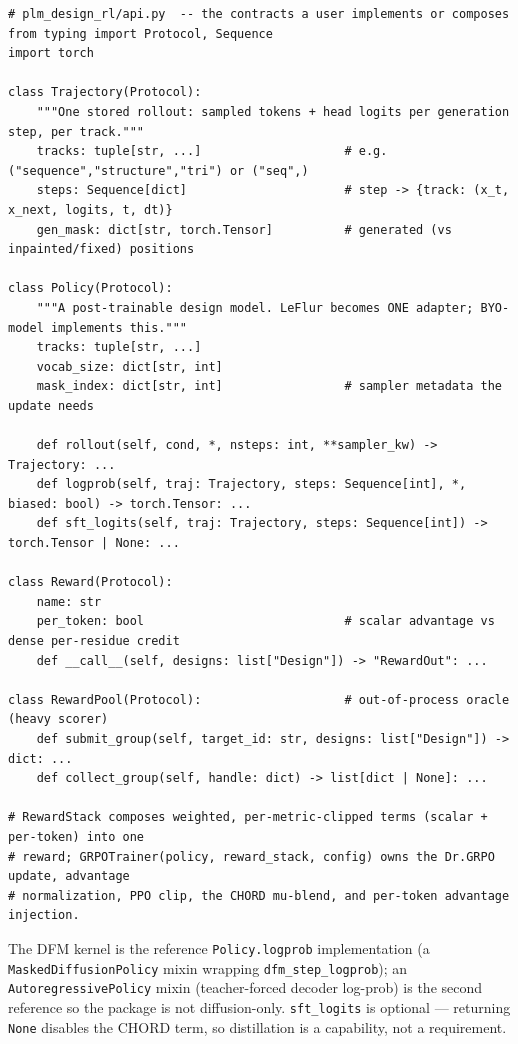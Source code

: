 \documentclass[11pt]{article}
\newcommand{\ttk}[1]{\texttt{\small #1}}
\begin{document}
\begin{verbatim}
# plm_design_rl/api.py  -- the contracts a user implements or composes
from typing import Protocol, Sequence
import torch

class Trajectory(Protocol):
    """One stored rollout: sampled tokens + head logits per generation step, per track."""
    tracks: tuple[str, ...]                    # e.g. ("sequence","structure","tri") or ("seq",)
    steps: Sequence[dict]                      # step -> {track: (x_t, x_next, logits, t, dt)}
    gen_mask: dict[str, torch.Tensor]          # generated (vs inpainted/fixed) positions

class Policy(Protocol):
    """A post-trainable design model. LeFlur becomes ONE adapter; BYO-model implements this."""
    tracks: tuple[str, ...]
    vocab_size: dict[str, int]
    mask_index: dict[str, int]                 # sampler metadata the update needs

    def rollout(self, cond, *, nsteps: int, **sampler_kw) -> Trajectory: ...
    def logprob(self, traj: Trajectory, steps: Sequence[int], *, biased: bool) -> torch.Tensor: ...
    def sft_logits(self, traj: Trajectory, steps: Sequence[int]) -> torch.Tensor | None: ...

class Reward(Protocol):
    name: str
    per_token: bool                            # scalar advantage vs dense per-residue credit
    def __call__(self, designs: list["Design"]) -> "RewardOut": ...

class RewardPool(Protocol):                    # out-of-process oracle (heavy scorer)
    def submit_group(self, target_id: str, designs: list["Design"]) -> dict: ...
    def collect_group(self, handle: dict) -> list[dict | None]: ...

# RewardStack composes weighted, per-metric-clipped terms (scalar + per-token) into one
# reward; GRPOTrainer(policy, reward_stack, config) owns the Dr.GRPO update, advantage
# normalization, PPO clip, the CHORD mu-blend, and per-token advantage injection.
\end{verbatim}

The DFM kernel is the reference \ttk{Policy.logprob} implementation (a
\ttk{MaskedDiffusionPolicy} mixin wrapping \ttk{dfm\_step\_logprob}); an
\ttk{AutoregressivePolicy} mixin (teacher-forced decoder log-prob) is the second reference so the
package is not diffusion-only. \ttk{sft\_logits} is optional --- returning \ttk{None} disables the
CHORD term, so distillation is a capability, not a requirement.
\end{document}
